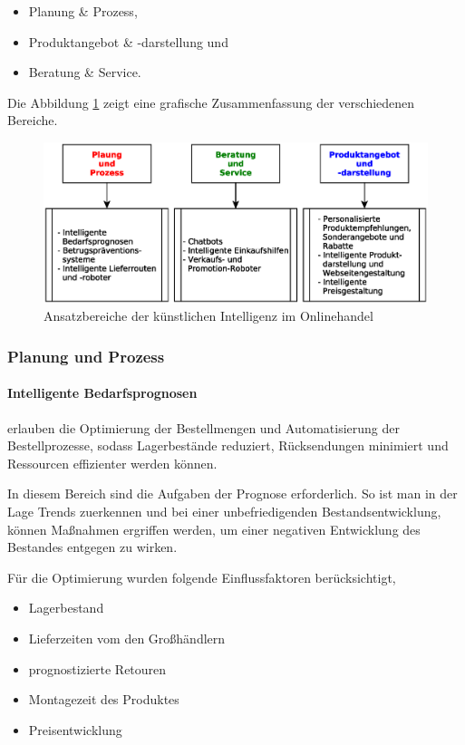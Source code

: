 \begin{itemize}
	\item Planung \& Prozess,
	\item Produktangebot \& -darstellung und
	\item Beratung \& Service.
\end{itemize}

Die Abbildung \ref{img:areas_of_application_for_ai_in_e__commerce} zeigt eine grafische Zusammenfassung der verschiedenen Bereiche.

\begin{figure}[!ht]
	\centering
	\includegraphics[width=\linewidth]{images/ki-bereiche_glaess.eps}
	\caption{Ansatzbereiche der künstlichen Intelligenz im Onlinehandel}
	\label{img:areas_of_application_for_ai_in_e__commerce}
\end{figure}

\subsubsection{Planung und Prozess}
\paragraph{Intelligente Bedarfsprognosen} erlauben die Optimierung der Bestellmengen und Automatisierung der Bestellprozesse, sodass Lagerbestände reduziert, Rücksendungen minimiert und Ressourcen effizienter werden können.\vspace{0.2cm}

In diesem Bereich sind die Aufgaben der Prognose erforderlich. So ist man in der Lage Trends zuerkennen und bei einer unbefriedigenden Bestandsentwicklung, können Maßnahmen ergriffen werden, um einer negativen Entwicklung des Bestandes entgegen zu wirken.\vspace{0.2cm}

Für die Optimierung wurden folgende Einflussfaktoren berücksichtigt,

\begin{itemize}
	\item Lagerbestand
	\item Lieferzeiten vom den Großhändlern
	\item prognostizierte Retouren
	\item Montagezeit des Produktes
	\item Preisentwicklung
\end{itemize}

